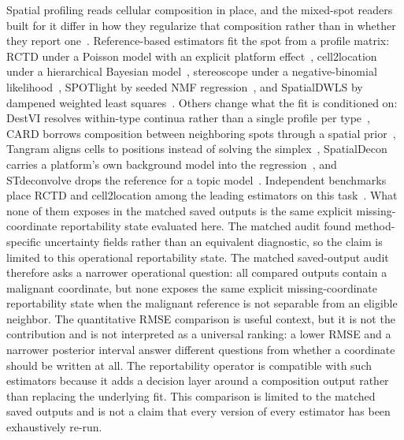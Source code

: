 Spatial profiling reads cellular composition in place, and the mixed-spot readers built for it differ in how they regularize that composition rather than in whether they report one~\citep{Elhanani2023,Rao2021,Moses2022}. Reference-based estimators fit the spot from a profile matrix: RCTD under a Poisson model with an explicit platform effect~\citep{Cable2022}, cell2location under a hierarchical Bayesian model~\citep{Kleshchevnikov2022}, stereoscope under a negative-binomial likelihood~\citep{Andersson2020}, SPOTlight by seeded NMF regression~\citep{ElosuaBayes2021}, and SpatialDWLS by dampened weighted least squares~\citep{Dong2021}. Others change what the fit is conditioned on: DestVI resolves within-type continua rather than a single profile per type~\citep{Lopez2022}, CARD borrows composition between neighboring spots through a spatial prior~\citep{Ma2022}, Tangram aligns cells to positions instead of solving the simplex~\citep{Biancalani2021}, SpatialDecon carries a platform's own background model into the regression~\citep{Danaher2022}, and STdeconvolve drops the reference for a topic model~\citep{Miller2022}. Independent benchmarks place RCTD and cell2location among the leading estimators on this task~\citep{Li2022integrate,Sangaram2024}. What none of them exposes in the matched saved outputs is the same explicit missing-coordinate reportability state evaluated here. The matched audit found method-specific uncertainty fields rather than an equivalent diagnostic, so the claim is limited to this operational reportability state. The matched saved-output audit therefore asks a narrower operational question: all compared outputs contain a malignant coordinate, but none exposes the same explicit missing-coordinate reportability state when the malignant reference is not separable from an eligible neighbor. The quantitative RMSE comparison is useful context, but it is not the contribution and is not interpreted as a universal ranking: a lower RMSE and a narrower posterior interval answer different questions from whether a coordinate should be written at all. The reportability operator is compatible with such estimators because it adds a decision layer around a composition output rather than replacing the underlying fit. This comparison is limited to the matched saved outputs and is not a claim that every version of every estimator has been exhaustively re-run.

